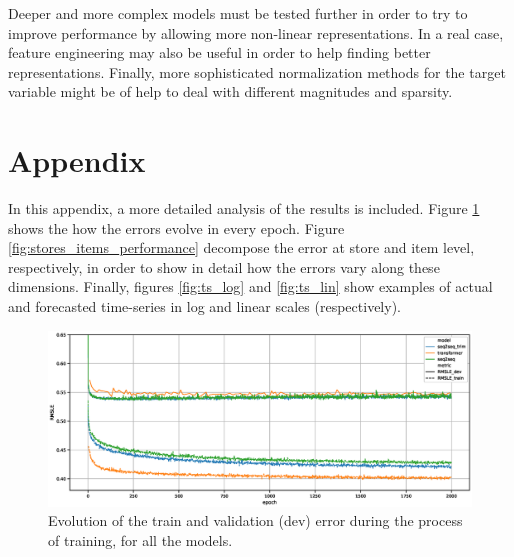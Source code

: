 \documentclass{elsarticle}
\begin{document}
	Deeper and more complex models must be tested further in order to try to improve performance by allowing more non-linear representations. In a real case, feature engineering may also be useful in order to help finding better representations. Finally, more sophisticated normalization methods for the target variable might be of help to deal with different magnitudes and sparsity.
	
	\newpage
	
	
	
	
	\newpage
	\section*{Appendix}
	In this appendix, a more detailed analysis of the results is included. Figure \ref{fig:performance_evolution} shows the how the errors evolve in every epoch. Figure \ref{fig:stores_items_performance} decompose the error at store and item level, respectively, in order to show in detail how the errors vary along these dimensions. Finally, figures \ref{fig:ts_log} and \ref{fig:ts_lin} show examples of actual and forecasted time-series in log and linear scales (respectively).
	
	\begin{figure}[h!]
		\centering
		\includegraphics[width=1\linewidth]{img/evolution}
		\caption{Evolution of the train and validation (dev) error during the process of training, for all the models.}
		\label{fig:performance_evolution}
	\end{figure}
	
\end{document}
